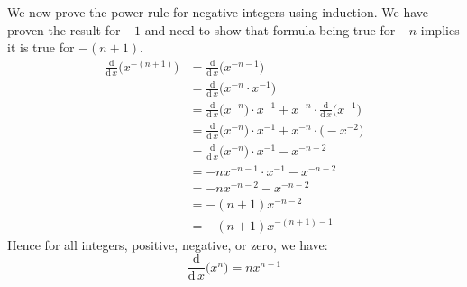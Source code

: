 \documentclass{article}
\theoremstyle{plain}
\begin{document}
    We now prove the power rule for negative integers using induction.
    We have proven the result for $-1$ and need to show that formula being true
    for $-n$ implies it is true for $-(n+1)$.
    \begin{align}
        \frac{\textrm{d}}{\textrm{d}\,x}\big(x^{-(n+1)}\big)
            &=\frac{\textrm{d}}{\textrm{d}\,x}\big(x^{-n-1}\big)\\
            &=\frac{\textrm{d}}{\textrm{d}\,x}\big(x^{-n}\cdot{x}^{-1}\big)\\
            &=\frac{\textrm{d}}{\textrm{d}\,x}\big(x^{-n}\big)\cdot{x}^{-1}
                +x^{-n}\cdot\frac{\textrm{d}}{\textrm{d}\,x}\big(x^{-1}\big)\\
            &=\frac{\textrm{d}}{\textrm{d}\,x}\big(x^{-n}\big)\cdot{x}^{-1}
                +x^{-n}\cdot\big(-x^{-2}\big)\\
            &=\frac{\textrm{d}}{\textrm{d}\,x}\big(x^{-n}\big)\cdot{x}^{-1}
                -x^{-n-2}\\
            &=-nx^{-n-1}\cdot{x}^{-1}-x^{-n-2}\\
            &=-nx^{-n-2}-x^{-n-2}\\
            &=-(n+1)x^{-n-2}\\
            &=-(n+1)x^{-(n+1)-1}
    \end{align}
    Hence for all integers, positive, negative, or zero, we have:
    \begin{equation}
        \frac{\textrm{d}}{\textrm{d}\,x}\big(x^{n}\big)
            =nx^{n-1}
    \end{equation}
\end{document}
